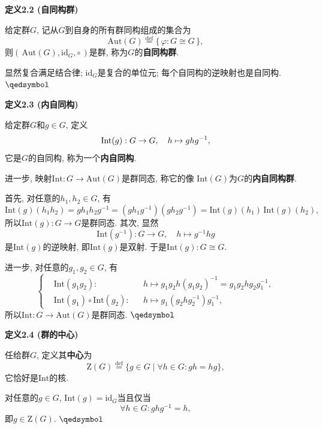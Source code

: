 \documentclass[UTF8]{ctexart}
\begin{document}
\vspace{10pt}

\hypertarget{sec:定义2.2}{}
\noindent\textbf{定义2.2 (自同构群)}

给定群$G$, 记从$G$到自身的所有群同构组成的集合为
\[
    \mathrm{Aut}(G)\overset{\mathrm{def}}{=}\{\,\varphi:G\cong G\,\},
\]
则$(\,\mathrm{Aut}(G),\mathrm{id}_G,\circ\,)$是群, 称为$G$的\textbf{自同构群}.


显然复合满足结合律; $\mathrm{id}_G$是复合的单位元; 每个自同构的逆映射也是自同构.
\hfill $\qedsymbol$

\vspace{10pt}

\hypertarget{sec:定义2.3}{}
\noindent\textbf{定义2.3 (内自同构)}

给定群$G$和$g\in G$, 定义
\vspace{-3pt}
\[
    \mathrm{Int}(g):G\to G,\quad h\mapsto ghg^{-1},\\[-3pt]
\]
它是$G$的自同构, 称为一个\textbf{内自同构}.

进一步, 映射$\mathrm{Int}:G\to\mathrm{Aut}(G)$是群同态, 称它的像
$\mathrm{Int}(G)$为$G$的\textbf{内自同构群}.


首先, 对任意的$h_1,h_2\in G$, 有
\[
    \mathrm{Int}(g)(h_1h_2)=gh_1h_2g^{-1}=(gh_1g^{-1})(gh_2g^{-1})
    =\mathrm{Int}(g)(h_1)\,\mathrm{Int}(g)(h_2),
\]
所以$\mathrm{Int}(g):G\to G$是群同态. 其次, 显然
\[
    \mathrm{Int}(g^{-1}):G\to G,\quad h\mapsto g^{-1}hg
\]
是$\mathrm{Int}(g)$的逆映射, 即$\mathrm{Int}(g)$是双射.
于是$\mathrm{Int}(g):G\cong G$.

进一步, 对任意的$g_1,g_2\in G$, 有
\[\left\{\begin{aligned}
    &\mathrm{Int}(g_1g_2):&&h\mapsto
    g_1g_2h(g_1g_2)^{-1}=g_1g_2hg_2g_1^{-1},\\[-3pt]
    &\mathrm{Int}(g_1)\circ\mathrm{Int}(g_2):&&h\mapsto
    g_1(g_2hg_2^{-1})g_1^{-1},
\end{aligned}\right.\]
所以$\mathrm{Int}:G\to\mathrm{Aut}(G)$是群同态. \hfill $\qedsymbol$

\vspace{10pt}

\hypertarget{sec:定义2.4}{}
\noindent\textbf{定义2.4 (群的中心)}

任给群$G$, 定义其\textbf{中心}为
\[
    \mathrm{Z}(G)\overset{\mathrm{def}}{=}\{g\in G\mid\forall h\in G:gh=hg\},
\]
它恰好是$\mathrm{Int}$的核.


对任意的$g\in G$, $\mathrm{Int}(g)=\mathrm{id}_{G}$当且仅当
\[
    \forall h\in G:ghg^{-1}=h,
\]
即$g\in \mathrm{Z}(G)$. \hfill $\qedsymbol$
\end{document}
